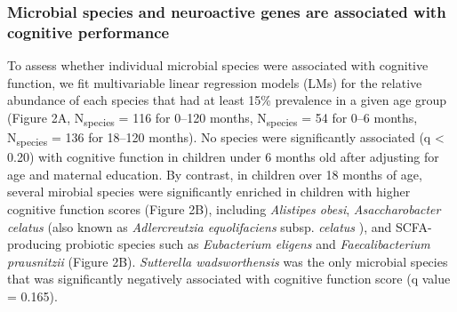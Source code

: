 \documentclass{article}
\begin{document}
\subsubsection*{Microbial species and neuroactive genes are associated with cognitive performance}

To assess whether individual microbial species were associated with
cognitive function, we fit multivariable linear regression models (LMs)
\cite{mallickMultivariableAssociationDiscovery2021}
for the relative abundance of each species that had at least 15\%
prevalence in a given age group (Figure 2A, N\textsubscript{species} = 116 for 0--120 months, 
N\textsubscript{species} = 54 for 0--6 months, N\textsubscript{species} = 136 for 18--120 months).
No species were significantly associated (q \textless{} 0.20) with
cognitive function in children under 6 months old after adjusting for
age and maternal education.
By contrast, in children over 18 months of age,
several mirobial species were significantly enriched
in children with higher cognitive function scores (Figure 2B),
including \emph{Alistipes obesi},
\emph{Asaccharobacter celatus} (also known as \textit{Adlercreutzia equolifaciens} subsp. \textit{celatus}
\cite{maruoAdlercreutziaEquolifaciensGen2008}),
and SCFA-producing probiotic
species such as \emph{Eubacterium eligens} and \emph{Faecalibacterium
prausnitzii}
\cite{ghoshMediterraneanDietIntervention2020}
(Figure 2B). \textit{Sutterella wadsworthensis} was the only microbial species
that was significantly negatively associated with cognitive function score (q value = 0.165).
\end{document}
